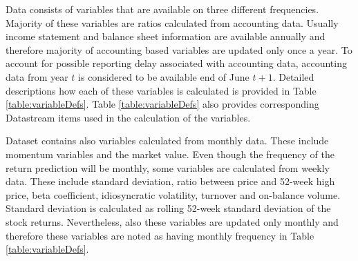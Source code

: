 \documentclass{article}
\begin{document}
Data consists of variables that are available on three different frequencies. Majority of these variables are ratios calculated from accounting data. 
Usually income statement and balance sheet information are available annually and therefore majority of accounting based variables are updated only once a year. To account for possible reporting delay associated with accounting data, accounting data from year $t$ is considered to be available end of June $t+1$. Detailed descriptions how each of these variables is calculated is provided in Table \ref{table:variableDefs}. Table \ref{table:variableDefs} also provides corresponding Datastream items used in the calculation of the variables. 

Dataset contains also variables calculated from monthly data. These include momentum variables and the market value. Even though the frequency of the return prediction will be monthly, some variables are calculated from weekly data. These include standard deviation, ratio between price and 52-week high price, beta coefficient, idiosyncratic volatility, turnover and on-balance volume. Standard deviation is calculated as rolling 52-week standard deviation of the stock returns. Nevertheless, also these variables are updated only monthly and therefore these variables are noted as having monthly frequency in Table \ref{table:variableDefs}. \par
\end{document}
